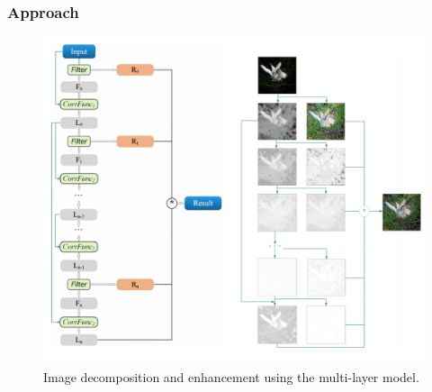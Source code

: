 \documentclass[a4paper, 10pt]{article}
\begin{document}
			\subsubsection{Approach}
			
			\begin{figure}[htbp]
				\centering 
				\includegraphics[width=0.7\columnwidth]{picture/LLIE/Fusion-based/decomposition and enhancement}
				\caption{
					\label{fig: decomposition and enhancement} 
					Image decomposition and enhancement using the multi-layer model.
				}
			\end{figure}
			
\end{document}
